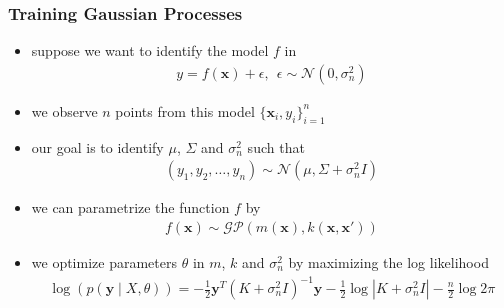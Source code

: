 \begin{frame}[t]
	
	\frametitle{Training Gaussian Processes}
	
	\begin{itemize}
		\item suppose we want to identify the model \(f\) in 
			\begin{gather*}
				y = f(\mathbf{x}) + \epsilon, \ \ \epsilon \sim \mathcal{N}(0,\sigma_n^2)
			\end{gather*}

	\end{itemize}
	\begin{itemize}
		\item we observe \(n\) points from this model \(\{\mathbf{x}_i,y_i\}_{i=1}^n\)
	\end{itemize}
	
	\begin{itemize}
		\item our goal is to identify \(\mu\), \(\Sigma\) and \(\sigma_n^2\) such that
		\begin{gather*}
		(y_1,y_2,\dots,y_n) \sim \mathcal{N}(\mu, \Sigma+\sigma_n^2 I)
		\end{gather*}
	\end{itemize}

	\begin{itemize}
	\item we can parametrize the function \(f\) by
	\begin{gather*}
	f(\mathbf{x}) \sim \mathcal{GP} (m(\mathbf{x}), k(\mathbf{x},\mathbf{x}'))
	\end{gather*}
	\end{itemize}

	\begin{itemize}
	\item we optimize parameters \(\theta\) in \(m\), \(k\) and \(\sigma_n^2\) by maximizing the log likelihood
	\begin{gather*}
	\log(p(\mathbf{y} \mid X, \theta)) = -\frac{1}{2}\mathbf{y}^T {(K+\sigma_n^2I)}^{-1} \mathbf{y} -\frac{1}{2} \log {|K+\sigma_n^2I|} -\frac{n}{2} \log{2\pi}
	\end{gather*}
\end{itemize}	
	
\end{frame}

